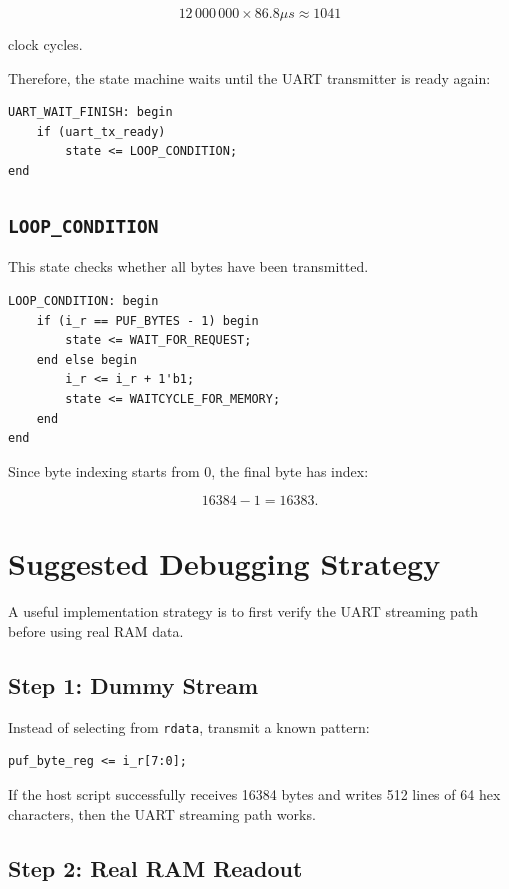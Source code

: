 \documentclass[11pt,a4paper]{article}
\begin{document}
\[
12\,000\,000 \times 86.8 \mu s \approx 1041
\]

clock cycles.

Therefore, the state machine waits until the UART transmitter is ready again:

\begin{lstlisting}
UART_WAIT_FINISH: begin
    if (uart_tx_ready)
        state <= LOOP_CONDITION;
end
\end{lstlisting}

\subsection{\texttt{LOOP\_CONDITION}}

This state checks whether all bytes have been transmitted.

\begin{lstlisting}
LOOP_CONDITION: begin
    if (i_r == PUF_BYTES - 1) begin
        state <= WAIT_FOR_REQUEST;
    end else begin
        i_r <= i_r + 1'b1;
        state <= WAITCYCLE_FOR_MEMORY;
    end
end
\end{lstlisting}

Since byte indexing starts from 0, the final byte has index:

\[
16384 - 1 = 16383.
\]

\section{Suggested Debugging Strategy}

A useful implementation strategy is to first verify the UART streaming path before using real RAM data.

\subsection{Step 1: Dummy Stream}

Instead of selecting from \texttt{rdata}, transmit a known pattern:

\begin{lstlisting}
puf_byte_reg <= i_r[7:0];
\end{lstlisting}

If the host script successfully receives 16384 bytes and writes 512 lines of 64 hex characters, then the UART streaming path works.

\subsection{Step 2: Real RAM Readout}
\end{document}
